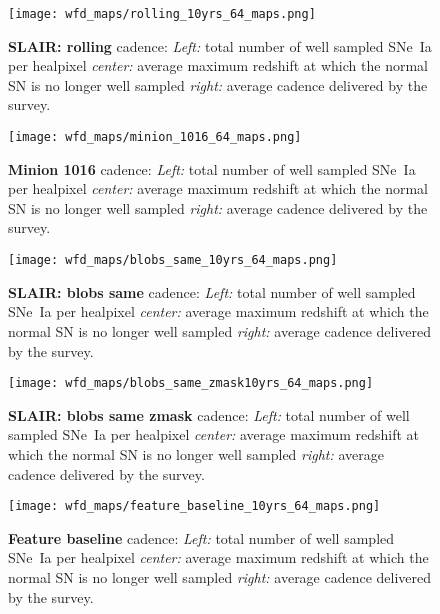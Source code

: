 \begin{figure}[!htbp]
  \begin{center}
    \texttt{[image: wfd\_maps/rolling\_10yrs\_64\_maps.png]}
    \caption{{\bf SLAIR: rolling} cadence: {\em Left:} total number of well
      sampled SNe~Ia per healpixel {\em center:} average maximum
      redshift at which the normal SN is no longer well sampled {\em
        right:} average cadence delivered by the survey.}
    \label{fig:slair_rolling}
  \end{center}
\end{figure}

\begin{figure}[!htbp]
  \begin{center}
    \texttt{[image: wfd\_maps/minion\_1016\_64\_maps.png]}
    \caption{{\bf Minion 1016} cadence: {\em Left:} total number of well
      sampled SNe~Ia per healpixel {\em center:} average maximum
      redshift at which the normal SN is no longer well sampled {\em
        right:} average cadence delivered by the survey.}
    \label{fig:minion_1016}
  \end{center}
\end{figure}

\begin{figure}[!htbp]
  \begin{center}
    \texttt{[image: wfd\_maps/blobs\_same\_10yrs\_64\_maps.png]}
    \caption{{\bf SLAIR: blobs same} cadence: {\em Left:} total number of well
      sampled SNe~Ia per healpixel {\em center:} average maximum
      redshift at which the normal SN is no longer well sampled {\em
        right:} average cadence delivered by the survey.}
    \label{fig:blobs_same}
  \end{center}
\end{figure}

\begin{figure}[!htbp]
  \begin{center}
    \texttt{[image: wfd\_maps/blobs\_same\_zmask10yrs\_64\_maps.png]}
    \caption{{\bf SLAIR: blobs same zmask} cadence: {\em Left:} total number of well
      sampled SNe~Ia per healpixel {\em center:} average maximum
      redshift at which the normal SN is no longer well sampled {\em
        right:} average cadence delivered by the survey.}
    \label{fig:blobs_same_zmask}
  \end{center}
\end{figure}

  
\begin{figure}[!htbp]
  \begin{center}
    \texttt{[image: wfd\_maps/feature\_baseline\_10yrs\_64\_maps.png]}
    \caption{{\bf Feature baseline} cadence: {\em Left:} total number of well
      sampled SNe~Ia per healpixel {\em center:} average maximum
      redshift at which the normal SN is no longer well sampled {\em
        right:} average cadence delivered by the survey.}
    \label{fig:feature_baseline}
  \end{center}
\end{figure}
